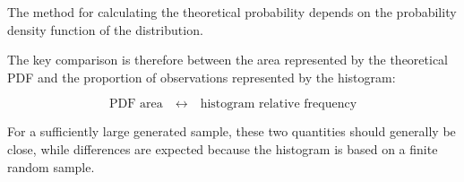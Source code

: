 The method for calculating the theoretical probability depends on the
probability density function of the distribution.

The key comparison is therefore between the area represented by the
theoretical PDF and the proportion of observations represented by the
histogram:

\[
\boxed{
	\text{PDF area}
	\quad\longleftrightarrow\quad
	\text{histogram relative frequency}
}
\]

For a sufficiently large generated sample, these two quantities should
generally be close, while differences are expected because the histogram is
based on a finite random sample.







